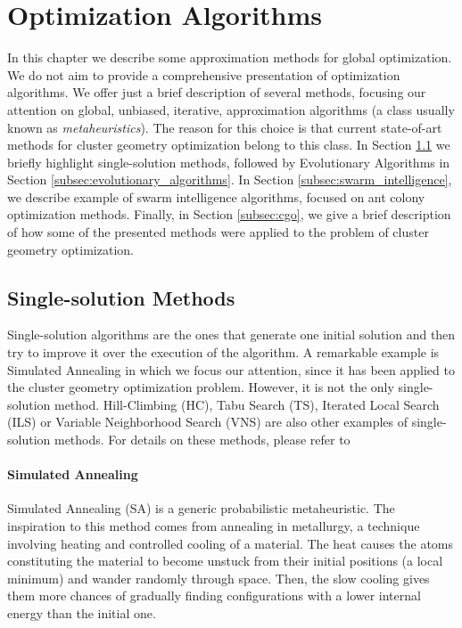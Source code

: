 \chapter{Optimization Algorithms}
	\label{chap:opt_alg}
		
	    In this chapter we describe some approximation methods for global optimization. We do not aim to provide a comprehensive presentation of optimization algorithms. We offer just a brief description of several methods, focusing our attention on global, unbiased, iterative, approximation algorithms (a class usually known as \emph{metaheuristics}). The reason for this choice is that current state-of-art methods for cluster geometry optimization belong to this class. In Section \ref{subsec:single_state_solution} we briefly highlight single-solution methods, followed by Evolutionary Algorithms in Section \ref{subsec:evolutionary_algorithms}. In Section \ref{subsec:swarm_intelligence}, we describe example of swarm intelligence algorithms, focused on ant colony optimization methods. Finally, in Section \ref{subsec:cgo}, we give a brief description of how some of the presented methods were applied to the problem of cluster geometry optimization. 
		\section{Single-solution Methods}
			\label{subsec:single_state_solution}
		 	Single-solution algorithms are the ones that generate one initial solution and then try to improve it over the execution of the algorithm. A remarkable example is Simulated Annealing in which we focus our attention, since it has been applied to the cluster geometry optimization problem. However, it is not the only single-solution method. Hill-Climbing (HC), Tabu Search (TS), Iterated Local Search (ILS) or Variable Neighborhood Search (VNS) are also other examples of single-solution methods. For details on these methods, please refer to \cite{luke09}  		
			
			\subsubsection*{Simulated Annealing}
			Simulated Annealing (SA) \cite{kirkpatrick83} is a generic probabilistic metaheuristic. The inspiration to this method comes from annealing in metallurgy, a technique involving heating and controlled cooling of a material. The heat causes the atoms constituting the material to become unstuck from their initial positions (a local minimum) and wander randomly through space. Then, the slow cooling gives them more chances of gradually finding configurations with a lower internal energy than the initial one.

